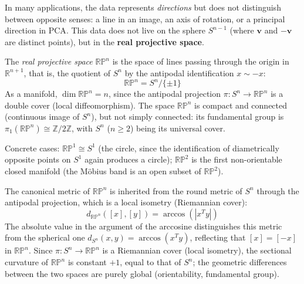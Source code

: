 In many applications, the data represents \textit{directions} but does not distinguish between opposite senses: a line in an image, an axis of rotation, or a principal direction in \gls{PCA}. This data does not live on the sphere $S^{n-1}$ (where $\mathbf{v}$ and $-\mathbf{v}$ are distinct points), but in the \textbf{real projective space}.

\begin{definition}\label{def:espacio_proyectivo}
The \textit{real projective space} $\mathbb{RP}^n$ is the space of lines passing through the origin in $\mathbb{R}^{n+1}$, that is, the quotient of $S^n$ by the antipodal identification $x \sim -x$:
\[
\mathbb{RP}^n = S^n / \{\pm 1\}
\]
As a manifold, $\dim \mathbb{RP}^n = n$, since the antipodal projection $\pi: S^n \to \mathbb{RP}^n$ is a double cover (local diffeomorphism). The space $\mathbb{RP}^n$ is compact and connected (continuous image of $S^n$), but not simply connected: its fundamental group is $\pi_1(\mathbb{RP}^n) \cong \mathbb{Z}/2\mathbb{Z}$, with $S^n$ ($n \geq 2$) being its universal cover.

Concrete cases: $\mathbb{RP}^1 \cong S^1$ (the circle, since the identification of diametrically opposite points on $S^1$ again produces a circle); $\mathbb{RP}^2$ is the first non-orientable closed manifold (the Möbius band is an open subset of $\mathbb{RP}^2$).
\end{definition}

The canonical metric of $\mathbb{RP}^n$ is inherited from the round metric of $S^n$ through the antipodal projection, which is a local isometry (Riemannian cover):
\[
d_{\mathbb{RP}^n}([x], [y]) = \arccos(|x^T y|)
\]
The absolute value in the argument of the arccosine distinguishes this metric from the spherical one $d_{S^n}(x,y) = \arccos(x^T y)$, reflecting that $[x] = [-x]$ in $\mathbb{RP}^n$. Since $\pi: S^n \to \mathbb{RP}^n$ is a Riemannian cover (local isometry), the sectional curvature of $\mathbb{RP}^n$ is constant $+1$, equal to that of $S^n$; the geometric differences between the two spaces are purely global (orientability, fundamental group).

